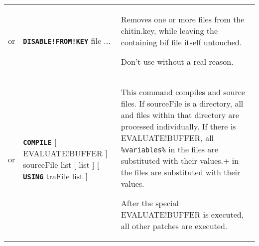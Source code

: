 \documentclass{article}
\def\ttref#1{\ahrefloc{#1}{\tt #1}}
\def\DEFINE#1{{\tt \bf #1}\label{#1}\index{#1}}
\def\Slist{{\color{red} list }}
\def\Ob{{\color{red} [ }}
\def\Oe{{\color{red} ] }}
\begin{document}
\begin{tabular}{cp{10in}|p{10in}}
  or & \DEFINE{DISABLE!FROM!KEY} file ... &
		Removes one or more files from the chitin.key, while leaving the
		containing bif file itself untouched.
		
		Don't use without a real reason.
       \\
       
  or & \DEFINE{COMPILE} \Ob EVALUATE!BUFFER \Oe sourceFile \Slist
       \Ob \ttref{patch} \Slist \Oe \Ob \DEFINE{USING} traFile \Slist \Oe &
      This command compiles \ttref{D} and \ttref{BAF} source files. If
      sourceFile is a directory, all \ttref{D} and \ttref{BAF} files within
      that directory are processed individually. If there is EVALUATE!BUFFER,
      all \verb+%variables%+ in the files are substituted with their values.
      
      After the special EVALUATE!BUFFER is executed, all other patches are executed.



\end{tabular}
\end{document}
